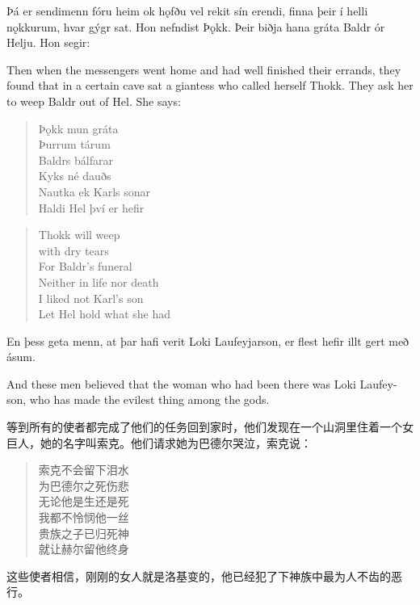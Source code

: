\begin{paracol}{2}
  Þá er sendimenn fóru heim ok hǫfðu vel rekit sín erendi, finna þeir í helli nǫkkurum, hvar gýgr sat. Hon nefndist Þǫkk. Þeir biðja hana gráta Baldr ór Helju. Hon segir:

  \switchcolumn

  Then when the messengers went home and had well finished their errands, they found that in a certain cave sat a giantess who called herself Thokk. They ask her to weep Baldr out of Hel. She says:
  \switchcolumn*

  \begin{quote}
    Þǫkk mun gráta\\
    Þurrum tárum\\
    Baldrs bálfarar\\
    Kyks né dauðs\\
    Nautka ek Karls sonar\\
    Haldi Hel því er hefir
  \end{quote}

  \switchcolumn

  \begin{quote}
    Thokk will weep\\
    with dry tears\\
    For Baldr's funeral\\
    Neither in life nor death\\
    I liked not Karl's son\\
    Let Hel hold what she had
  \end{quote}

  \switchcolumn*
  En þess geta menn, at þar hafi verit Loki Laufeyjarson, er flest hefir illt gert með ásum.

  \switchcolumn

  And these men believed that the woman who had been there was Loki Laufey-son, who has made the evilest thing among the gods.
\end{paracol}
\begin{translation*}{}
  等到所有的使者都完成了他们的任务回到家时，他们发现在一个山洞里住着一个女巨人，她的名字叫索克。他们请求她为巴德尔哭泣，索克说：
  \begin{quote}
    索克不会留下泪水\\
    为巴德尔之死伤悲\\
    无论他是生还是死\\
    我都不怜悯他一丝\\
    贵族之子已归死神\\
    就让赫尔留他终身
  \end{quote}

  这些使者相信，刚刚的女人就是洛基变的，他已经犯了下神族中最为人不齿的恶行。
\end{translation*}
